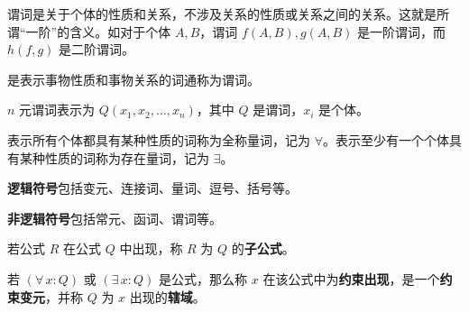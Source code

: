 谓词是关于个体的性质和关系，不涉及关系的性质或关系之间的关系。这就是所谓“一阶”的含义。如对于个体 $A, B$，谓词 $f(A, B), g(A, B)$ 是一阶谓词，而 $h(f, g)$ 是二阶谓词。

\begin{definition}[谓词]
    是表示事物性质和事物关系的词通称为谓词。

    $n$ 元谓词表示为 $Q(x_1, x_2, \dots, x_n)$，其中 $Q$ 是谓词，$x_i$ 是个体。
\end{definition}

\begin{definition}[量词]
    表示所有个体都具有某种性质的词称为全称量词，记为 $\forall$。表示至少有一个个体具有某种性质的词称为存在量词，记为 $\exists$。
\end{definition}

\begin{definition}[字符集]
    \textbf{逻辑符号}包括变元、连接词、量词、逗号、括号等。

    \textbf{非逻辑符号}包括常元、函词、谓词等。
\end{definition}

\begin{definition}[子公式]
    若公式 $R$ 在公式 $Q$ 中出现，称 $R$ 为 $Q$ 的\textbf{子公式}。
\end{definition}

\begin{definition}
    若 $(\forall\,x: Q)$ 或 $(\exists\,x: Q)$ 是公式，那么称 $x$ 在该公式中为\textbf{约束出现}，是一个\textbf{约束变元}，并称 $Q$ 为 $x$ 出现的\textbf{辖域}。
\end{definition}
